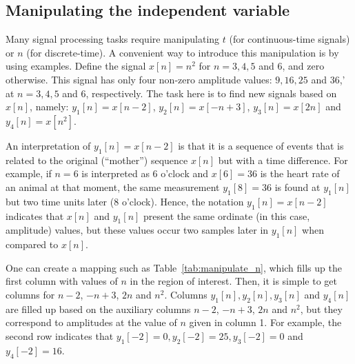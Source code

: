\subsection{Manipulating the independent variable}

Many signal processing tasks require manipulating $t$ (for continuous-time signals) or $n$ (for discrete-time).
A convenient way to introduce this manipulation is by using examples. 
Define the signal $x[n]=n^2$ for $n=3,4,5$ and 6, and zero otherwise. This signal has only four non-zero amplitude values: $9, 16, 25$ and 36,' at $n=3,4,5$ and 6, respectively. The task here is to find new signals based on $x[n]$, namely: $y_1[n]=x[n-2]$, $y_2[n]=x[-n+3]$, $y_3[n]=x[2n]$ and $y_4[n]=x[n^2]$. 

An interpretation of $y_1[n]=x[n-2]$ is that it is a sequence of events that is related to the original (``mother'') sequence $x[n]$ but with a time difference. For example, if $n=6$ is interpreted as 6 o'clock and $x[6]=36$ is the heart rate of an animal at that moment, the same measurement $y_1[8]=36$ is found at $y_1[n]$ but two time units later (8 o'clock). Hence, the notation $y_1[n]=x[n-2]$ indicates that $x[n]$ and $y_1[n]$ present the same ordinate (in this case, amplitude) values, but these values occur two samples later in $y_1[n]$ when compared to $x[n]$.

One can create a mapping such as Table~\ref{tab:manipulate_n}, which fills up the first column with values of $n$ in the region of interest. Then, it is simple to get columns for $n-2$, $-n+3$, $2n$ and $n^2$. 
Columns $y_1[n], y_2[n], y_3[n]$ and $y_4[n]$ are filled up based on the auxiliary columns $n-2$, $-n+3$, $2n$ and $n^2$, but they correspond to amplitudes at the value of $n$ given in column 1. For example, the second row indicates that $y_1[-2]=0, y_2[-2]=25, y_3[-2]=0$ and $y_4[-2]=16$.


